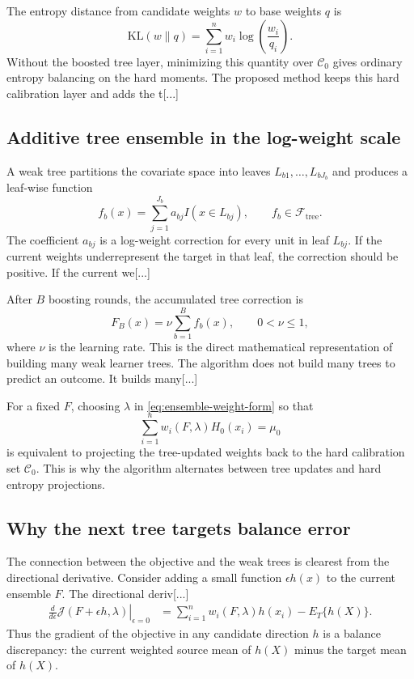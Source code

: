 \documentclass[11pt]{article}
\begin{document}
The entropy distance from candidate weights $w$ to base weights $q$ is
\begin{equation*}
\mathrm{KL}(w\|q)
=
\sum_{i=1}^n w_i\log\left(\frac{w_i}{q_i}\right).
\end{equation*}
Without the boosted tree layer, minimizing this quantity over $\mathcal{C}_0$ gives ordinary entropy balancing on the hard moments. The proposed method keeps this hard calibration layer and adds the t[...] 

\subsection{Additive tree ensemble in the log-weight scale}

A weak tree partitions the covariate space into leaves $L_{b1},\ldots,L_{bJ_b}$ and produces a leaf-wise function
\begin{equation*}
f_b(x)
=
\sum_{j=1}^{J_b} a_{bj} I(x\in L_{bj}),
\qquad f_b\in\mathcal{F}_{\mathrm{tree}}.
\end{equation*}
The coefficient $a_{bj}$ is a log-weight correction for every unit in leaf $L_{bj}$. If the current weights underrepresent the target in that leaf, the correction should be positive. If the current we[...] 

After $B$ boosting rounds, the accumulated tree correction is
\begin{equation*}
F_B(x)
=
\nu\sum_{b=1}^B f_b(x),
\qquad 0<\nu\leq 1,
\end{equation*}
where $\nu$ is the learning rate. This is the direct mathematical representation of building many weak learner trees. The algorithm does not build many trees to predict an outcome. It builds many[...]

For a fixed $F$, choosing $\lambda$ in \eqref{eq:ensemble-weight-form} so that
\begin{equation*}
\sum_{i=1}^n w_i(F,\lambda)H_0(x_i)=\mu_0
\end{equation*}
is equivalent to projecting the tree-updated weights back to the hard calibration set $\mathcal{C}_0$. This is why the algorithm alternates between tree updates and hard entropy projections.

\subsection{Why the next tree targets balance error}

The connection between the objective and the weak trees is clearest from the directional derivative. Consider adding a small function $\epsilon h(x)$ to the current ensemble $F$. The directional deriv[...]
\begin{align}
\left.
\frac{d}{d\epsilon}
\mathcal{J}(F+\epsilon h,\lambda)
\right|_{\epsilon=0}
&=
\sum_{i=1}^n w_i(F,\lambda)h(x_i)
-
E_T\{h(X)\}.
\label{eq:directional-derivative}
\end{align}
Thus the gradient of the objective in any candidate direction $h$ is a balance discrepancy: the current weighted source mean of $h(X)$ minus the target mean of $h(X)$.
\end{document}

